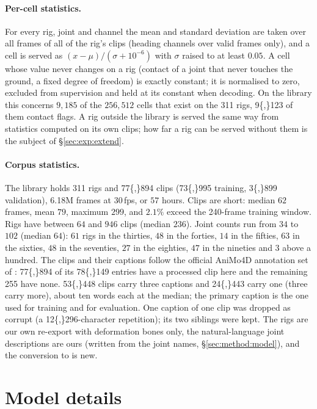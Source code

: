 \paragraph{Per-cell statistics.} For every rig, joint and channel the mean and standard deviation
are taken over all frames of all of the rig's clips (heading channels over valid frames only), and a
cell is served as $(x-\mu)/(\sigma+10^{-6})$ with $\sigma$ raised to at least $0.05$. A cell whose
value never changes on a rig (contact of a joint that never touches the ground, a fixed degree of
freedom) is exactly constant; it is normalised to zero, excluded from supervision and held at its
constant when decoding. On the library this concerns $9{,}185$ of the $256{,}512$ cells that exist
on the \num{311} rigs, \num{9{,}123} of them contact flags. A rig outside the
library is served the same way from statistics computed on its own clips; how far a rig can be served
without them is the subject of \S\ref{sec:exp:extend}.

\paragraph{Corpus statistics.} The library holds \num{311} rigs and \num{77{,}894} clips
(\num{73{,}995} training, \num{3{,}899} validation), \num{6.18}M frames at 30\,fps, or $57$
hours. Clips are short: median $62$ frames, mean $79$, maximum $299$, and $2.1\%$ exceed the
240-frame training window. Rigs have between $64$ and $946$ clips (median $236$). Joint counts run from
$34$ to $102$ (median $64$): $61$ rigs in the thirties, $48$ in the forties, $14$ in the fifties,
$63$ in the sixties, $48$ in the seventies, $27$ in the eighties, $47$ in the nineties and $3$ above
a hundred. The clips and their captions follow the official AniMo4D annotation set of
\citet{wang2025animo}: \num{77{,}894} of its \num{78{,}149} entries have a processed clip here and the
remaining 255 have none. \num{53{,}448} clips carry three captions and \num{24{,}443} carry one (three
carry more), about ten words each at the median; the primary caption is the one used for training and
for evaluation. One caption of one clip was dropped as corrupt (a \num{12{,}296}-character repetition);
its two siblings were kept. The rigs are our own re-export with deformation bones only, the
natural-language joint descriptions are ours (written from the joint names, \S\ref{sec:method:model}),
and the conversion to \rep{} is new.

\section{Model details}\label{app:model}

